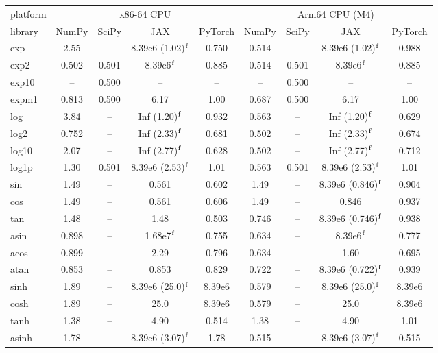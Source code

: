 \begin{table}
\centering
\begin{small}
\begin{tabular}{|l|cccc|cccc|}
\hline
platform & \multicolumn{4}{c|}{x86-64 CPU} & \multicolumn{4}{c|}{Arm64 CPU (M4)} \\
library & NumPy & SciPy & JAX & PyTorch & NumPy & SciPy & JAX & PyTorch \\ \hline
exp & 2.55 & -- & 8.39e6 (1.02)$^{\rm f}$ & 0.750 & 0.514 & -- & 8.39e6 (1.02)$^{\rm f}$ & 0.988 \\
exp2 & 0.502 & 0.501 & 8.39e6$^{\rm f}$ & 0.885 & 0.514 & 0.501 & 8.39e6$^{\rm f}$ & 0.885 \\
exp10 & -- & 0.500 & -- & -- & -- & 0.500 & -- & -- \\
expm1 & 0.813 & 0.500 & 6.17 & 1.00 & 0.687 & 0.500 & 6.17 & 1.00 \\
log & 3.84 & -- & Inf (1.20)$^{\rm f}$ & 0.932 & 0.563 & -- & Inf (1.20)$^{\rm f}$ & 0.629 \\
log2 & 0.752 & -- & Inf (2.33)$^{\rm f}$ & 0.681 & 0.502 & -- & Inf (2.33)$^{\rm f}$ & 0.674 \\
log10 & 2.07 & -- & Inf (2.77)$^{\rm f}$ & 0.628 & 0.502 & -- & Inf (2.77)$^{\rm f}$ & 0.712 \\
log1p & 1.30 & 0.501 & 8.39e6 (2.53)$^{\rm f}$ & 1.01 & 0.563 & 0.501 & 8.39e6 (2.53)$^{\rm f}$ & 1.01 \\
sin & 1.49 & -- & 0.561 & 0.602 & 1.49 & -- & 8.39e6 (0.846)$^{\rm f}$ & 0.904 \\
cos & 1.49 & -- & 0.561 & 0.606 & 1.49 & -- & 0.846 & 0.937 \\
tan & 1.48 & -- & 1.48 & 0.503 & 0.746 & -- & 8.39e6 (0.746)$^{\rm f}$ & 0.938 \\
asin & 0.898 & -- & 1.68e7$^{\rm f}$ & 0.755 & 0.634 & -- & 8.39e6$^{\rm f}$ & 0.777 \\
acos & 0.899 & -- & 2.29 & 0.796 & 0.634 & -- & 1.60 & 0.695 \\
atan & 0.853 & -- & 0.853 & 0.829 & 0.722 & -- & 8.39e6 (0.722)$^{\rm f}$ & 0.939 \\
sinh & 1.89 & -- & 8.39e6 (25.0)$^{\rm f}$ & 8.39e6 & 0.579 & -- & 8.39e6 (25.0)$^{\rm f}$ & 8.39e6 \\
cosh & 1.89 & -- & 25.0 & 8.39e6 & 0.579 & -- & 25.0 & 8.39e6 \\
tanh & 1.38 & -- & 4.90 & 0.514 & 1.38 & -- & 4.90 & 1.01 \\
asinh & 1.78 & -- & 8.39e6 (3.07)$^{\rm f}$ & 1.78 & 0.515 & -- & 8.39e6 (3.07)$^{\rm f}$ & 0.515 \\

\end{tabular}
\end{small}
\end{table}
